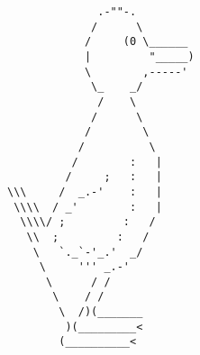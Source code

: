 \documentclass{article}
\begin{document}
\vfill
\centering
\tiny
\begin{BVerbatim}
              .-""-.
             /      \
            /     (0 \______
            |         "_____)
            \        ,-----'
             \_    _/
              /    \
             /      \
            /        \
           /          \
          /        :   |
         /     ;   :   |
\\\     /  _.-'    :   |
 \\\\  / _'        :   |
  \\\\/ ;         :   /
   \\  ;         :   /
    \   `._`-'_.'  _/
     \     ''' _.-'
      \      / /
       \    / /
        \  /)(_______
         )(_________<
        (__________<
\end{BVerbatim}
\end{document}
